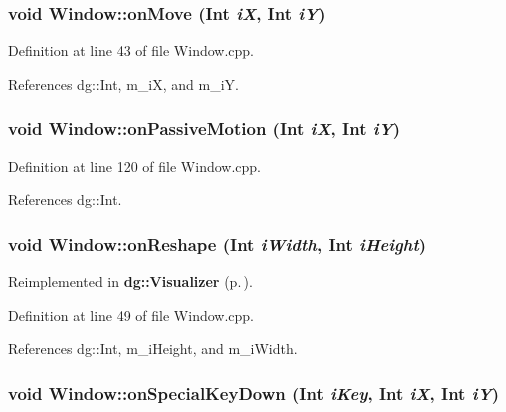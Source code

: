 \subsubsection{\setlength{\rightskip}{0pt plus 5cm}void Window::on\-Move ({\bf Int} {\em i\-X}, {\bf Int} {\em i\-Y})\hspace{0.3cm}{\tt  [virtual]}}\label{classdg_1_1Window_a4}




Definition at line 43 of file Window.cpp.

References dg::Int, m\_\-i\-X, and m\_\-i\-Y.
\subsubsection{\setlength{\rightskip}{0pt plus 5cm}void Window::on\-Passive\-Motion ({\bf Int} {\em i\-X}, {\bf Int} {\em i\-Y})\hspace{0.3cm}{\tt  [virtual]}}\label{classdg_1_1Window_a14}




Definition at line 120 of file Window.cpp.

References dg::Int.
\subsubsection{\setlength{\rightskip}{0pt plus 5cm}void Window::on\-Reshape ({\bf Int} {\em i\-Width}, {\bf Int} {\em i\-Height})\hspace{0.3cm}{\tt  [virtual]}}\label{classdg_1_1Window_a5}




Reimplemented in {\bf dg::Visualizer} {\rm (p.\,\pageref{classdg_1_1Visualizer_a4})}.

Definition at line 49 of file Window.cpp.

References dg::Int, m\_\-i\-Height, and m\_\-i\-Width.
\subsubsection{\setlength{\rightskip}{0pt plus 5cm}void Window::on\-Special\-Key\-Down ({\bf Int} {\em i\-Key}, {\bf Int} {\em i\-X}, {\bf Int} {\em i\-Y})\hspace{0.3cm}{\tt  [virtual]}}\label{classdg_1_1Window_a12}




